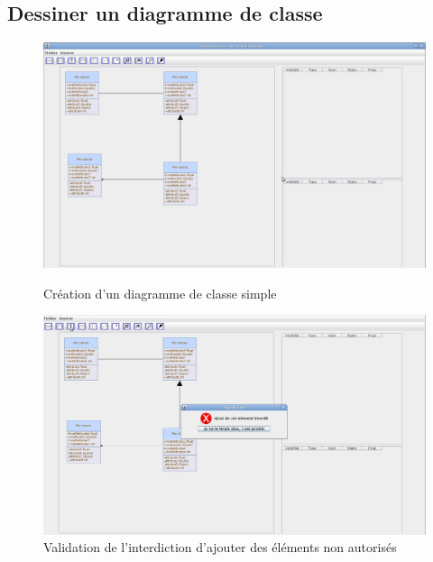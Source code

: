 \documentclass[12pt,a4paper,openany]{report}
\begin{document}
		\subsection{Dessiner un diagramme de classe}
		\begin{figure}[H]
			\centering
			\includegraphics[width=18cm]{validation1.jpg}\\ \vspace{25px} 
			\caption{Création d'un diagramme de classe simple}
			\includegraphics[width=18cm]{validation2.jpg}
			\caption{Validation de l'interdiction d'ajouter des éléments non autorisés}
		\end{figure}
\end{document}
